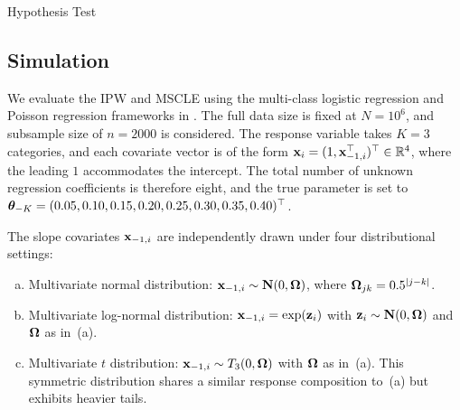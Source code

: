 \documentclass[12pt,hidelinks]{article}
\begin{document}
\begin{section}{Hypothesis Test}



\section{Simulation}

We evaluate the IPW and MSCLE using the multi-class logistic regression and Poisson regression frameworks in \citet{wang2022maximum}. The full data size is fixed at $N = 10^6$, and subsample size of $n = 2000$ is considered. 
The response variable takes $K = 3$ categories, and each covariate vector is of the form $\mathbf{x}_i = (1, \mathbf{x}_{-1,i}^\top)^\top \in \mathbb{R}^4$, where the leading $1$ accommodates the intercept. The total number of unknown regression coefficients is therefore eight, and the true parameter is set to $\bm{\theta}_{-K} = (0.05, 0.10, 0.15, 0.20, 0.25, 0.30, 0.35, 0.40)^\top$.

The slope covariates $\mathbf{x}_{-1,i}$ are independently drawn under four distributional settings:
\begin{enumerate}[(a)]
    \item Multivariate normal distribution: $\mathbf{x}_{-1,i} \sim \mathbf{N}(0, \bm{\Omega})$, where $\bm{\Omega}_{jk} = 0.5^{|j-k|}$. 

    \item Multivariate log-normal distribution: $\mathbf{x}_{-1,i} = \exp(\mathbf{z}_i)$ with $\mathbf{z}_i \sim \mathbf{N}(0, \bm{\Omega})$ and $\bm{\Omega}$ as in~(a). 
    
    \item Multivariate $t$ distribution: $\mathbf{x}_{-1,i} \sim T_3(0, \bm{\Omega})$ 
    with $\bm{\Omega}$ as in~(a). This symmetric distribution shares a similar response composition to~(a) but exhibits heavier tails.


\end{enumerate}
\end{section}
\end{document}
